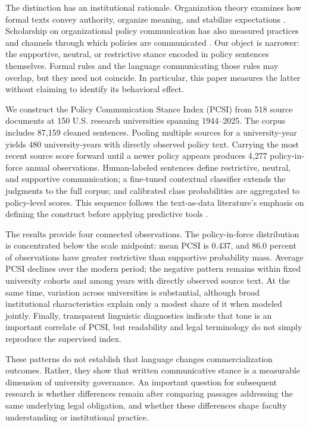 \documentclass[11pt]{article}
\begin{document}
The distinction has an institutional rationale. Organization theory examines how formal texts convey authority, organize meaning, and stabilize expectations \citep{phillips2004,putnam2009,weick1995,maitlis2014,scott2014}. Scholarship on organizational policy communication has also measured practices and channels through which policies are communicated \citep{canary2013}. Our object is narrower: the supportive, neutral, or restrictive stance encoded in policy sentences themselves. Formal rules and the language communicating those rules may overlap, but they need not coincide. In particular, this paper measures the latter without claiming to identify its behavioral effect.

We construct the Policy Communication Stance Index (PCSI) from 518 source documents at 150 U.S. research universities spanning 1944--2025. The corpus includes 87,159 cleaned sentences. Pooling multiple sources for a university-year yields 480 university-years with directly observed policy text. Carrying the most recent source score forward until a newer policy appears produces 4,277 policy-in-force annual observations. Human-labeled sentences define restrictive, neutral, and supportive communication; a fine-tuned contextual classifier extends the judgments to the full corpus; and calibrated class probabilities are aggregated to policy-level scores. This sequence follows the text-as-data literature's emphasis on defining the construct before applying predictive tools \citep{grimmer2013,gentzkow2019,grimmer2022,adcock2001}.

The results provide four connected observations. The policy-in-force distribution is concentrated below the scale midpoint: mean PCSI is 0.437, and 86.0 percent of observations have greater restrictive than supportive probability mass. Average PCSI declines over the modern period; the negative pattern remains within fixed university cohorts and among years with directly observed source text. At the same time, variation across universities is substantial, although broad institutional characteristics explain only a modest share of it when modeled jointly. Finally, transparent linguistic diagnostics indicate that tone is an important correlate of PCSI, but readability and legal terminology do not simply reproduce the supervised index.

These patterns do not establish that language changes commercialization outcomes. Rather, they show that written communicative stance is a measurable dimension of university governance. An important question for subsequent research is whether differences remain after comparing passages addressing the same underlying legal obligation, and whether these differences shape faculty understanding or institutional practice.
\end{document}
